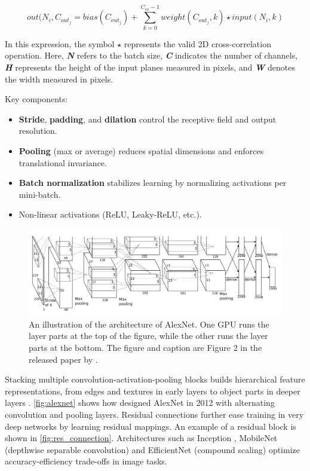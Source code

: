 \[out(N_i, C_{out_j}=bias(C_{out_j})+\sum_{k=0}^{C_{in}-1}weight(C_{out_j},k)\star input(N_i,k)\]

In this expression, the symbol \(\star\) represents the valid 2D cross-correlation operation. Here, \textit{\textbf{N}} refers to the batch size, \textit{\textbf{C}} indicates the number of channels, \textit{\textbf{H}} represents the height of the input planes measured in pixels, and \textit{\textbf{W}} denotes the width measured in pixels\cite{pytorch_conv2d}. 

Key components:
\begin{itemize}
    \item \textbf{Stride}, \textbf{padding}, and \textbf{dilation} control the receptive field and output resolution.
    \item \textbf{Pooling} (max or average) reduces spatial dimensions and enforces translational invariance.
    \item \textbf{Batch normalization} stabilizes learning by normalizing activations per mini-batch.
    \item Non-linear activations (ReLU, Leaky-ReLU, etc.). 
\end{itemize}

\begin{figure}
    \centering
    \includegraphics[width=1\linewidth]{figures/alexnet.png}
    \caption{An illustration of the architecture of AlexNet. One GPU runs the layer parts at the top of the figure, while the other runs the layer parts at the bottom. The figure and caption are Figure 2 in the released paper by \textcite{krizhevsky_alexnet}.}
    \label{fig:alexnet}
\end{figure}

Stacking multiple convolution-activation-pooling blocks builds hierarchical feature representations, from edges and textures in early layers to object parts in deeper layers \cite{lecun_deep_learning_2015}. \autoref{fig:alexnet} shows how \textcite{krizhevsky_alexnet} designed AlexNet in 2012 with alternating convolution and pooling layers. Residual connections \cite{he_deep_residual_2015} further ease training in very deep networks by learning residual mappings. An example of a residual block is shown in \autoref{fig:res_connection}. Architectures such as Inception \cite{szegedy_going_2014}, MobileNet (depthwise separable convolution) \cite{howard_mobilenets_2017} and EfficientNet (compound scaling) \cite{tan_efficientnet_2020} optimize accuracy-efficiency trade-offs in image tasks. 

